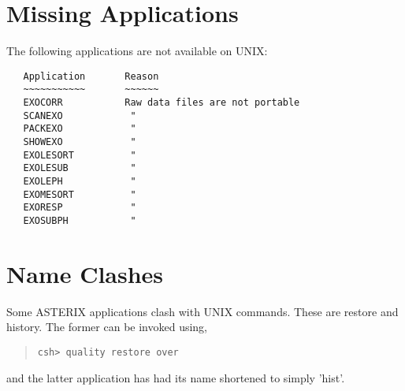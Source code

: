 \documentclass{book}
\renewcommand{\_}{{\tt\char'137}}     %
\begin{document}
\section{Missing Applications}
The following applications are not available on UNIX:
\begin{verbatim}
   Application       Reason
   ~~~~~~~~~~~       ~~~~~~
   EXOCORR           Raw data files are not portable
   SCANEXO            "
   PACKEXO            "
   SHOWEXO            "
   EXOLESORT          "
   EXOLESUB           "
   EXOLEPH            "
   EXOMESORT          "
   EXORESP            "
   EXOSUBPH           "
\end{verbatim}
\section{Name Clashes}
Some ASTERIX applications clash with UNIX commands. These are
restore and history. The former can be invoked using,

\begin{quote}\begin{verbatim}
csh> quality restore over
\end{verbatim}\end{quote}
and the latter application has had its name shortened to simply
'hist'.
\end{document}
